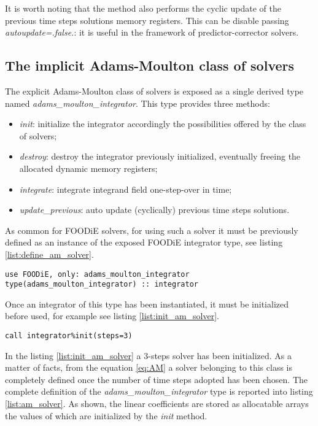 It is worth noting that the method also performs the cyclic update of the previous time steps solutions memory registers. This can be disable passing \emph{autoupdate=.false.}: it is useful in the framework of predictor-corrector solvers.

\subsection{The implicit Adams-Moulton class of solvers}\label{subsec:solver_am}

The explicit Adams-Moulton class of solvers is exposed as a single derived type named \emph{adams\_moulton\_integrator}. This type provides three methods:

\begin{itemize}
  \item \emph{init}: initialize the integrator accordingly the possibilities offered by the class of solvers;
  \item \emph{destroy}: destroy the integrator previously initialized, eventually freeing the allocated dynamic memory registers;
  \item \emph{integrate}: integrate integrand field one-step-over in time;
  \item \emph{update\_previous}: auto update (cyclically) previous time steps solutions.
  \end{itemize}

As common for FOODiE solvers, for using such a solver it must be previously defined as an instance of the exposed FOODiE integrator type, see listing \ref{list:define_am_solver}.

\begin{lstlisting}[firstnumber=1,style=code,caption={definition of an implicit Adams-Moulton integrator},label={list:define_am_solver}]
use FOODiE, only: adams_moulton_integrator
type(adams_moulton_integrator) :: integrator
\end{lstlisting}

Once an integrator of this type has been instantiated, it must be initialized before used, for example see listing \ref{list:init_am_solver}.

\begin{lstlisting}[firstnumber=1,style=code,caption={example of initialization of an implicit Adams-Moulton integrator},label={list:init_am_solver}]
call integrator%init(steps=3)
\end{lstlisting}

In the listing \ref{list:init_am_solver} a 3-steps solver has been initialized. As a matter of facts, from the equation \ref{eq:AM} a solver belonging to this class is completely defined once the number of time steps adopted has been chosen. The complete definition of the \emph{adams\_moulton\_integrator} type is reported into listing \ref{list:am_solver}. As shown, the linear coefficients are stored as allocatable arrays the values of which are initialized by the \emph{init} method.

